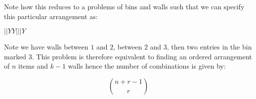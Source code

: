\documentclass[12pt]{extbook}
\begin{document}
Note how this reduces to a problems of bins and walls such that we can specify this particular arrangement as:

$||YY|||Y$

Note we have walls between $1$ and $2$, between $2$ and $3$, then two entries in the bin marked $3$.   This problem is therefore equivalent to finding an ordered arrangement of $n$ items and $k-1$ walls hence the number of combinations is given by:

\begin{displaymath}
\binom{n+r-1}{r}
\end{displaymath}



 





 

 



\end{document}
